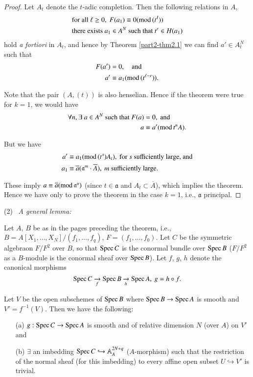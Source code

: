 \begin{proof}
Let $A_{t}$ denote the $t$-adic completion. Then the following
relations in $A$,
\begin{align*}
& \text{for all~ }\ell \geq 0,\ F(a_{1})\equiv
  0(\text{mod\,}(t^{I}))\\
&\text{there exists~ }a_{1}\in A^{N}\text{~ such that~ }t^{r}\in H(a_{1})
\end{align*}
hold {\em a fortiori} in $A_{t}$, and hence by Theorem
\ref{part2-thm2.1} we can find $a' \in A^{N}_{t}$ such that
\begin{align*}
F(a') &= 0,\quad\text{and}\\
a' &\equiv a_{1}(\text{mod\,}(t^{\ell-r})).
\end{align*}

Note that the pair $(A,(t))$ is also henselian. Hence if the theorem
were true for $k=1$, we would have
\begin{align*}
\forall n, \exists \; a\in A^{N}\text{~ such that~ }F(a) &= 0,\text{~
  and}\\
a &\equiv a'(\text{mod\,}t^{n}A).
\end{align*}

But we have
\begin{align*}
a' &\equiv a_{1}(\text{mod\,}(t^{s})A_{t}),\text{~ for~ } s \text{~
  sufficiently large, and}\\
a_{1} &\equiv \overline{a}(\mathfrak{a}^{m}\cdot
\overline{A}),\ m\text{~ sufficiently large.}
\end{align*}

These imply $a\equiv \overline{a}(\text{mod\,}\mathfrak{a}^{n})$
(since $t\in \mathfrak{a}$ and $A_{t}\subset \overline{A}$), which
implies the theorem. Hence we have only to prove the theorem in the
case $k=1$, i.e., $\mathfrak{a}$ principal.
\end{proof}

\smallskip
(2)~ {\em A general lemma:}

\setcounter{lemma}{1}
\begin{lemma}\label{part2-lem3.2}
Let $A$, $B$ be as in the pages preceding the theorem, i.e.,
$B=A[X_{1},\ldots,X_{N}]/(f_{1},\ldots,f_{q})$,
$F=(f_{1},\ldots,f_{0})$. Let $C$ be the symmetric
algebra\pageoriginale on $F/F^{2}$ over $B$, so that $\operatorname{Spec} C$ is the
conormal bundle over $\operatorname{Spec} B$ ($F/F^{2}$ as a $B$-module is the
conormal sheaf over $\operatorname{Spec} B$). Let $f$, $g$, $h$ denote the canonical
morphisms 
$$
\operatorname{Spec} C\xrightarrow[f]{}\operatorname{Spec} B\xrightarrow[h]{}\operatorname{Spec} A,\ g=h\circ f. 
$$


Let $V$ be the open subschemes of $\operatorname{Spec} B$ where $\operatorname{Spec} B\to \operatorname{Spec} A$
is smooth and $V'=f^{-1}(V)$. Then we have the following:
\begin{itemize}
\item[\rm(a)] $g:\operatorname{Spec} C\to \operatorname{Spec} A$ is smooth and of relative dimension
  $N$ (over $A$) on $V'$ and

\item[\rm(b)] $\exists$ an imbedding $\operatorname{Spec} C\hookrightarrow
  \mathbb{A}^{2N+q}_{A}$ ($A$-morphism) such that the restriction of
  the normal sheaf (for this imbedding) to every affine open subset
  $U\hookrightarrow V'$ is trivial.
\end{itemize}
\end{lemma}

